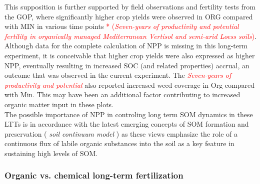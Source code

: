 \documentclass[12pt]{report}
\newcommand{\myRed}[1]{\textcolor{red}{#1}} %
\begin{document}
			This supposition is further supported by field observations and fertility tests from the GOP, where significantly higher crop yields were observed in ORG compared with MIN in various time points \myRed{* (\textit{Seven-years of productivity and potential fertility in organically managed Mediterranean Vertisol and semi-arid Loess soils})}. Although data for the complete calculation of NPP is missing in this long-term experiment, it is conceivable that higher crop yields were also expressed as higher NPP, eventually resulting in increased SOC (and related properties) accrual, an outcome that was observed in the current experiment. The \myRed{\textit{Seven-years of productivity and potential}} also reported increased weed coverage in Org compared with Min. This may have been an additional factor contributing to increased organic matter input in these plots.\\
			The possible importance of NPP in controling long term SOM dynamics in these LTTs is in accordance with the latest emerging concepts of SOM formation and preservation (\textit{ soil continuum model} ) as these views emphasize the role of a continuous flux of labile organic substances into the soil as a key feature in sustaining high levels of SOM.
			
		\subsubsection{Organic vs. chemical long-term fertilization}
				
\end{document}
